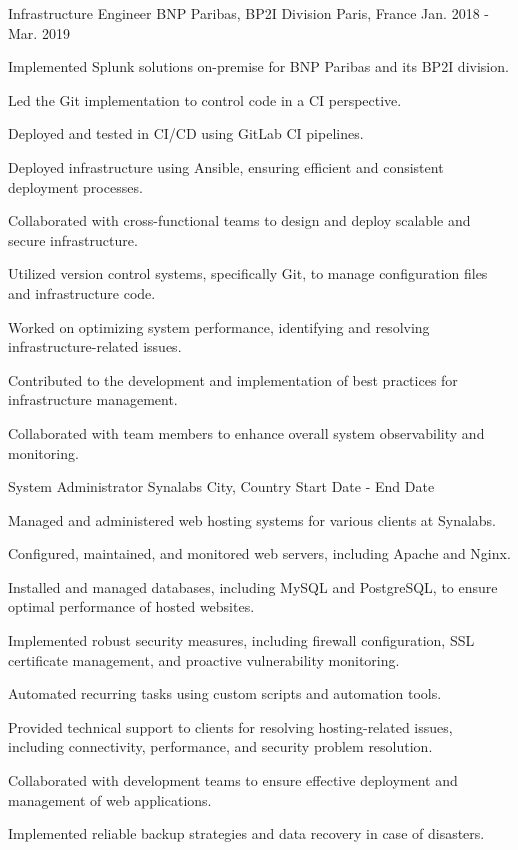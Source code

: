 \begin{cventries}
\cventry
{Infrastructure Engineer} %
{BNP Paribas, BP2I Division} %
{Paris, France} %
{Jan. 2018 - Mar. 2019} %
{
  \begin{cvitems} %
    \item {Implemented Splunk solutions on-premise for BNP Paribas and its BP2I division.}
    \item {Led the Git implementation to control code in a CI perspective.}
    \item {Deployed and tested in CI/CD using GitLab CI pipelines.}
    \item {Deployed infrastructure using Ansible, ensuring efficient and consistent deployment processes.}
    \item {Collaborated with cross-functional teams to design and deploy scalable and secure infrastructure.}
    \item {Utilized version control systems, specifically Git, to manage configuration files and infrastructure code.}
    \item {Worked on optimizing system performance, identifying and resolving infrastructure-related issues.}
    \item {Contributed to the development and implementation of best practices for infrastructure management.}
    \item {Collaborated with team members to enhance overall system observability and monitoring.}
  \end{cvitems}
}

\cventry
{System Administrator} %
{Synalabs} %
{City, Country} %
{Start Date - End Date} %
{
  \begin{cvitems} %
    \item {Managed and administered web hosting systems for various clients at Synalabs.}
    \item {Configured, maintained, and monitored web servers, including Apache and Nginx.}
    \item {Installed and managed databases, including MySQL and PostgreSQL, to ensure optimal performance of hosted websites.}
    \item {Implemented robust security measures, including firewall configuration, SSL certificate management, and proactive vulnerability monitoring.}
    \item {Automated recurring tasks using custom scripts and automation tools.}
    \item {Provided technical support to clients for resolving hosting-related issues, including connectivity, performance, and security problem resolution.}
    \item {Collaborated with development teams to ensure effective deployment and management of web applications.}
    \item {Implemented reliable backup strategies and data recovery in case of disasters.}
  \end{cvitems}
}


\end{cventries}
